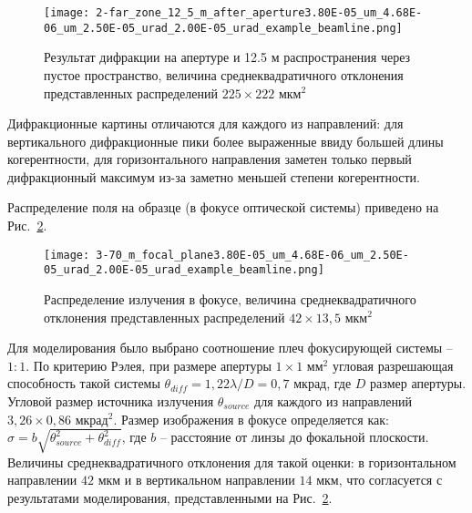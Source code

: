 \begin{figure}[H] 
	\centering 	\texttt{[image: 2-far\_zone\_12\_5\_m\_after\_aperture3.80E-05\_um\_4.68E-06\_um\_2.50E-05\_urad\_2.00E-05\_urad\_example\_beamline.png]}
	\caption{Результат дифракции на апертуре и 12.5 м распространения через пустое пространство, величина среднеквадратичного отклонения представленных распределений $225 \times 222$ мкм$^2$}
	\label{fig:focusing_system_after_aperture}
\end{figure}
\noindent Дифракционные картины отличаются для каждого из направлений: для вертикального дифракционные пики более выраженные ввиду большей длины когерентности, для горизонтального направления заметен только первый дифракционный максимум из-за заметно меньшей степени когерентности.

Распределение поля на образце (в фокусе оптической системы) приведено на Рис.~\ref{fig:focusing_system_in_focus}.
\begin{figure}[H] 
	\centering 	\texttt{[image: 3-70\_m\_focal\_plane3.80E-05\_um\_4.68E-06\_um\_2.50E-05\_urad\_2.00E-05\_urad\_example\_beamline.png]}
	\caption{Распределение излучения в фокусе, величина среднеквадратичного отклонения представленных распределений $42 \times 13,5$ мкм$^2$}
	\label{fig:focusing_system_in_focus}
\end{figure}
\noindent Для моделирования было выбрано соотношение плеч фокусирующей системы -- $1:1$. По критерию Рэлея, при размере апертуры $1 \times 1$ мм$^2$ угловая разрешающая способность такой системы $\theta_{diff} = 1,22 \lambda / D  = 0,7$ мкрад, где $D$ размер апертуры. Угловой размер источника излучения $\theta_{source}$ для каждого из направлений $3,26 \times 0,86$ мкрад$^2$. Размер изображения в фокусе определяется как: $\sigma = b\sqrt{\theta^2_{source} +  \theta^2_{diff}}$, где $b$ -- расстояние от линзы до фокальной плоскости. Величины среднеквадратичного отклонения для такой оценки: в горизонтальном направлении $42$ мкм и в вертикальном направлении $14$ мкм, что согласуется с результатами моделирования, представленными на Рис.~\ref{fig:focusing_system_in_focus}.  
